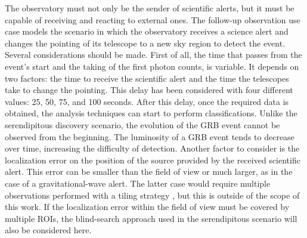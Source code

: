 The observatory must not only be the sender of scientific alerts, but it must be capable of receiving and reacting to external ones. The follow-up observation use case models the scenario in which the observatory receives a science alert and changes the pointing of its telescope to a new sky region to detect the event. Several considerations should be made. First of all, the time that passes from the event's start and the taking of the first photon counts, is variable. It depends on two factors: the time to receive the scientific alert and the time the telescopes take to change the pointing. This delay has been considered with four different values: 25, 50, 75, and 100 seconds. After this delay, once the required data is obtained, the analysis techniques can start to perform classifications. Unlike the serendipitous discovery scenario, the evolution of the GRB event cannot be observed from the beginning. The luminosity of a GRB event tends to decrease over time, increasing the difficulty of detection. Another factor to consider is the localization error on the position of the source provided by the received scientific alert. This error can be smaller than the field of view or much larger, as in the case of a gravitational-wave alert. The latter case would require multiple observations performed with a tiling strategy \cite{di2020detection}, but this is outside of the scope of this work. If the localization error within the field of view must be covered by multiple ROIs, the blind-search approach used in the serendipitous scenario will also be considered here.   

 
